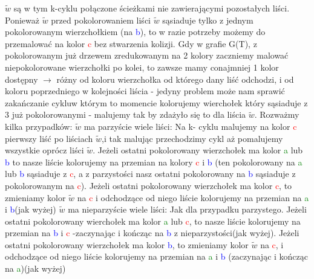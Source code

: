 \documentclass{article}
\begin{document}
$\widetilde{w}$ są w tym k-cyklu połączone ścieżkami nie zawierającymi pozostałych liści.\newline\newline
Ponieważ $\widetilde{w}$ przed pokolorowaniem liści $\widetilde{w}$ sąsiaduje tylko z jednym pokolorowanym wierzchołkiem (na \textcolor{blue}{b}), to
w razie potrzeby możemy do przemalować na kolor \textcolor{red}{c} bez stwarzenia kolizji.\newline
Gdy w grafie G(T), z pokolorowanym już drzewem zredukowanym na 2 kolory zaczniemy malować niepokolorowane wierzchołki po kolei, to zawsze mamy conajmniej 1 kolor
dostępny $\rightarrow$ różny od koloru wierzchołka od którego dany liść odchodzi, i od koloru poprzedniego w kolejności liścia -
jedyny problem może nam sprawić zakańczanie cykluw którym to momencie kolorujemy wierchołek który sąsiaduje z 3 już pokolorowanymi
- malujemy tak by zdażyło się to dla liścia $\widetilde{w}$.\newline\newline
Rozważmy kilka przypadków:\newline
$\widetilde{w}$ ma parzyście wiele liści:\quad
Na k- cyklu malujemy na kolor \textcolor{red}{c} pierwszy liść po liściach $\widetilde{w}$,i tak malując przechodzimy cykl aż pomalujemy wszystkie oprócz
liści $\widetilde{w}$. Jeżeli ostatni pokolorowany wierzchołek ma kolor \textcolor{Green}{a} lub \textcolor{blue}{b}
to nasze liście kolorujemy na przemian na kolory \textcolor{red}{c} i \textcolor{blue}{b} 
(ten pokolorowany na \textcolor{Green}{a} lub \textcolor{blue}{b} sąsiaduje z \textcolor{red}{c},
a z parzystości nasz ostatni pokolorowany na \textcolor{blue}{b} sąsiaduje z pokolorowanym na \textcolor{red}{c}).
Jeżeli ostatni pokolorowany wierzchołek ma kolor \textcolor{red}{c}, to zmieniamy kolor $\widetilde{w}$ na \textcolor{red}{c}
i odchodzące od niego liście kolorujemy na przemian na \textcolor{Green}{a} i \textcolor{blue}{b}(jak wyżej)\newline
$\widetilde{w}$ ma nieparzyście wiele liści:\quad
Jak dla przypadku parzystego. Jeżeli ostatni pokolorowany wierchołek ma kolor \textcolor{Green}{a} lub \textcolor{red}{c},
to nasze liście kolorujemy na przemian na \textcolor{blue}{b} i \textcolor{red}{c} -zaczynając i kończąc na \textcolor{blue}{b} z nieparzystości(jak wyżej).
Jeżeli ostatni pokolorowany wierzchołek ma kolor \textcolor{blue}{b}, to zmieniamy kolor $\widetilde{w}$ na \textcolor{red}{c},
i odchodzące od niego liście kolorujemy na przemian na \textcolor{Green}{a} i \textcolor{blue}{b} (zaczynając i kończąc na \textcolor{Green}{a})(jak wyżej)\newline
\end{document}
